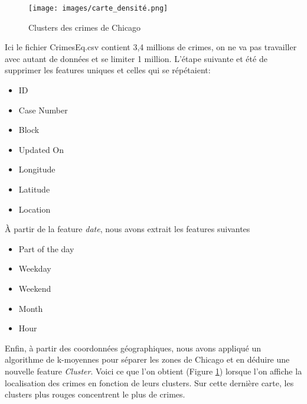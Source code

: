 \documentclass{article}
\begin{document}
    \begin{figure}
	    \centering
	    \texttt{[image: images/carte\_densité.png]}
	    \caption{Clusters des crimes de Chicago}
	    \label{E}
    \end{figure}
    Ici le fichier CrimesEq.csv contient 3,4 millions de crimes, on ne va pas travailler avec 
    autant de données et se limiter 1 million.
    L'étape suivante et été de supprimer les features uniques et celles qui se répétaient:
    \begin{itemize}
	    \item ID
	    \item Case Number
	    \item Block
	    \item Updated On
	    \item Longitude
	    \item Latitude
	    \item Location
    \end{itemize}
    À partir de la feature \textit{date}, nous avons extrait les features suivantes
    \begin{itemize}
	    \item Part of the day
	    \item Weekday
	    \item Weekend
	    \item Month
	    \item Hour
    \end{itemize}
    Enfin, à partir des coordonnées géographiques, nous avons appliqué un algorithme
    de k-moyennes pour séparer les zones de Chicago et en déduire une nouvelle
    feature \textit{Cluster}. 
    Voici ce que l'on obtient (Figure \ref{E}) lorsque l'on affiche la localisation des crimes en
    fonction de leurs clusters.
    Sur cette dernière carte, les clusters plus rouges concentrent le plus de crimes.
\end{document}
